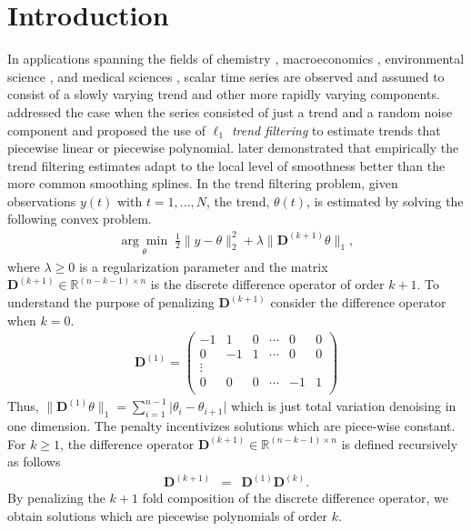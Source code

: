 \documentclass[12pt]{article}
\begin{document}
	\newpage
	\section{Introduction}
	\label{sec:intro}
	
	In applications spanning the fields of chemistry \citep{Ning2014}, macroeconomics \citep{yamada2017estimating}, environmental science \citep{brantley2014mobile}, and medical sciences \citep{pettersson2013algorithm, marandi2015qualitative}, scalar time series are observed and assumed to consist of a slowly varying trend and other more rapidly varying components. \cite{Kim2009} addressed the case when the series consisted of just a trend and a random noise component and proposed the use of \textit{$\ell_1$ trend filtering} to estimate trends that piecewise linear or piecewise polynomial. \cite{Tib2014} later demonstrated that empirically the trend filtering estimates adapt to the local level of smoothness better than the more common smoothing splines. In the trend filtering problem, given observations $y(t)$ with $t=1,...,N$, the trend, $\theta(t)$, is estimated by solving the following convex problem.
	\begin{eqnarray}
	\underset{\theta}{\arg\min}\; \frac{1}{2} \lVert y - \theta \rVert_2^2 + \lambda \lVert \mathbf{D}^{(k+1)}\theta \rVert_1,
	\end{eqnarray}
	where $\lambda \geq 0$ is a regularization parameter and the matrix $\mathbf{D}^{(k+1)} \in \mathbb{R}^{(n - k -1) \times n}$ is the discrete difference operator of order $k+1$. To understand the purpose of penalizing $\mathbf{D}^{(k+1)}$ consider the difference operator when $k = 0$.
	\begin{eqnarray}
	\mathbf{D}^{(1)} = \begin{pmatrix}
	-1 & 1 & 0 & \cdots & 0 & 0 \\
	0 & -1 & 1 & \cdots & 0 & 0 \\
	\vdots & & & & & \\
	0 & 0 & 0 & \cdots & -1 & 1 \\
	\end{pmatrix}
	\end{eqnarray}
	Thus, $\lVert \mathbf{D}^{(1)}\theta \rVert_1 = \sum_{i=1}^{n-1} \lvert \theta_i - \theta_{i+1} \rvert$ which is just total variation denoising in one dimension. The penalty incentivizes solutions which are piece-wise constant. For $k \geq 1$, the difference operator $\mathbf{D}^{(k+1)} \in \mathbb{R}^{(n-k-1) \times n}$ is defined recursively as follows
	\begin{eqnarray}
	\mathbf{D}^{(k+1)} & = & \mathbf{D}^{(1)}\mathbf{D}^{(k)}.
	\end{eqnarray}
	By penalizing the $k+1$ fold composition of the discrete difference operator, we obtain solutions which are piecewise polynomials of order $k$. 
	
\end{document}

